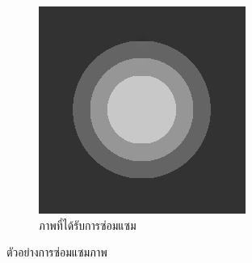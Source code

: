 \begin{figure}[H]
\begin{subfigure}{0.3\linewidth}
		\centering
		\includegraphics[width=0.8\linewidth]{image/grayscale_inpaint/result_splitbergman.png}
		\caption{ภาพที่ได้รับการซ่อมแซม}
	\end{subfigure}
	\caption{ตัวอย่างการซ่อมแซมภาพ}
	\label{fig1}
\end{figure}